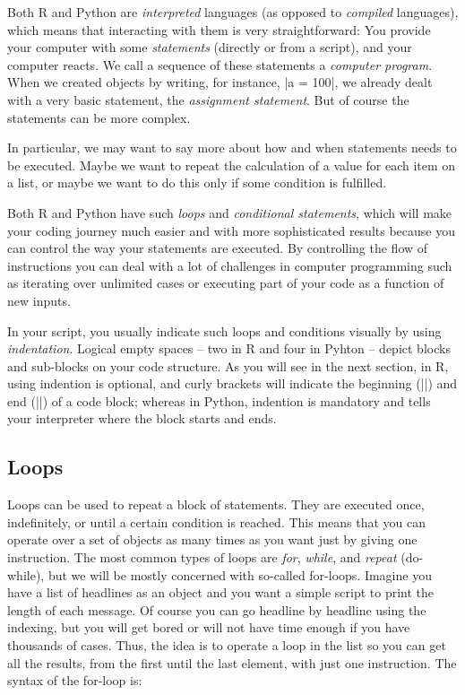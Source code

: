 Both R and Python are \emph{interpreted} languages (as opposed to
\emph{compiled} languages), which means that interacting with
them is very straightforward: You provide your computer with some
\emph{statements} (directly or from a script), and your computer
reacts. We call a sequence of these statements a \emph{computer program}.
When we created objects by writing, for instance,
|a = 100|,  we already dealt with a very basic statement, the \emph{assignment statement}. But of course the statements can be more complex.

In particular, we may want to say more about how and when
statements needs to be executed. Maybe we want to repeat
the calculation of a value for each item on a list, or maybe
we want to do this only if some condition is fulfilled.

Both R and Python have such \emph{loops} and \emph{conditional statements}, which will
make your coding journey much easier and with more sophisticated
results because you can control the way your statements are
executed. By controlling the flow of instructions you can deal with a
lot of challenges in computer programming such as iterating over
unlimited cases or executing part of your code as a function of new
inputs.

In your script, you usually indicate such loops and conditions
visually by using \emph{indentation}. Logical empty spaces -- two in R and four in
Pyhton -- depict blocks and sub-blocks on your code structure.
As you will see in the next section, in R, using indention
is optional, and curly brackets will indicate the beginning (|{|)
and end (|}|) of a code block; whereas in Python, indention
is mandatory and tells your interpreter where the block
starts and ends.





\subsection{Loops}
\label{sec:loops}
Loops can be used to repeat a block of statements.
They are executed once, indefinitely, or
until a certain condition is reached. This means that you can operate
over a set of objects as many times as you want just by giving one
instruction. The most common types of loops are \emph{for},
\emph{while}, and \emph{repeat} (do-while), but we will be mostly
concerned with so-called for-loops. Imagine you have a list of
headlines as an object and you want a simple script
to print the length of each message. Of course you can go headline
by headline using the indexing, but you will get bored or will not
have time enough if you have thousands of cases. Thus, the idea is to
operate a loop in the list so you can get all the results, from the
first until the last element, with just one instruction.  The syntax
of the for-loop is:

